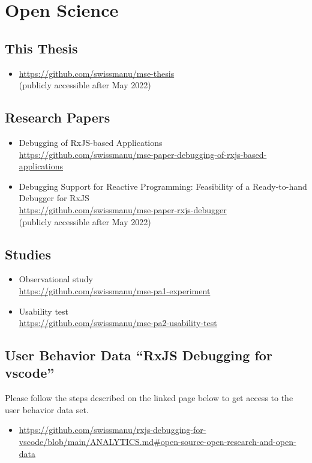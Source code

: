 \newpage



\section{Open Science}
\label{sec:open-science}

\subsection*{This Thesis}
\begin{itemize}
  \item \url{https://github.com/swissmanu/mse-thesis} \\ (publicly accessible after May 2022)
\end{itemize}

\subsection*{Research Papers}
\begin{itemize}
  \item Debugging of RxJS-based Applications \\ \url{https://github.com/swissmanu/mse-paper-debugging-of-rxjs-based-applications}
  \item Debugging Support for Reactive Programming: Feasibility of a Ready-to-hand Debugger for RxJS \\ \url{https://github.com/swissmanu/mse-paper-rxjs-debugger} \\ (publicly accessible after May 2022)
\end{itemize}

\subsection*{Studies}
\begin{itemize}
  \item Observational study \\ \url{https://github.com/swissmanu/mse-pa1-experiment}
  \item Usability test \\ \url{https://github.com/swissmanu/mse-pa2-usability-test}
\end{itemize}

\subsection*{User Behavior Data ``RxJS Debugging for vscode''}

Please follow the steps described on the linked page below to get access to the user behavior data set.

\begin{itemize}
  \item \url{https://github.com/swissmanu/rxjs-debugging-for-vscode/blob/main/ANALYTICS.md\#open-source-open-research-and-open-data}
\end{itemize}
